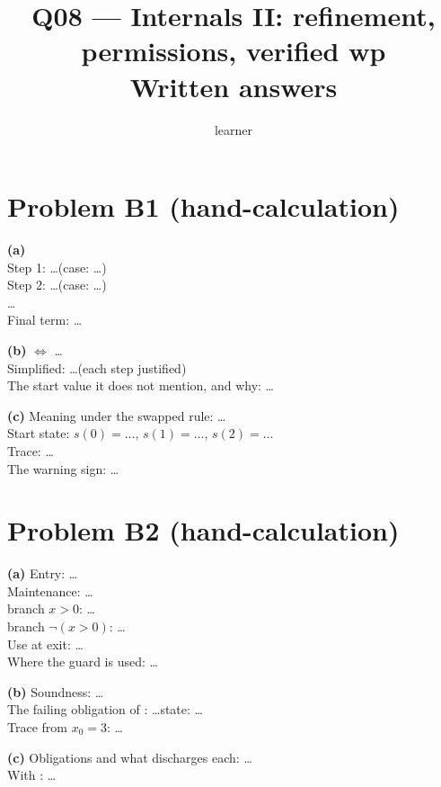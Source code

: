 \documentclass[11pt]{article}
\title{Q08 --- Internals II: refinement, permissions, verified wp \\ \large Written answers}
\author{learner}
\date{}
\begin{document}
\maketitle

\section*{Problem B1 (hand-calculation)}\label{ans:B1}
\begin{answer}
\textbf{(a)} \\
Step 1: \dots \quad (case: \dots) \\
Step 2: \dots \quad (case: \dots) \\
\dots \\
Final term: \dots

\textbf{(b)}  $\iff$ \dots \\
Simplified: \dots \quad (each step justified) \\
The start value it does not mention, and why: \dots

\textbf{(c)} Meaning under the swapped rule: \dots \\
Start state: $s(0) = \dots$, $s(1) = \dots$, $s(2) = \dots$ \\
Trace: \dots \\
The warning sign: \dots
\end{answer}

\section*{Problem B2 (hand-calculation)}\label{ans:B2}
\begin{answer}
\textbf{(a)} Entry: \dots \\
Maintenance: \dots \\
\hspace*{2em} branch $x > 0$: \dots \\
\hspace*{2em} branch $\neg(x > 0)$: \dots \\
Use at exit: \dots \\
Where the guard is used: \dots

\textbf{(b)} Soundness: \dots \\
The failing obligation of : \dots \quad state: \dots \\
Trace from $x_0 = 3$: \dots

\textbf{(c)} Obligations and what discharges each: \dots \\
With : \dots
\end{answer}
\end{document}
